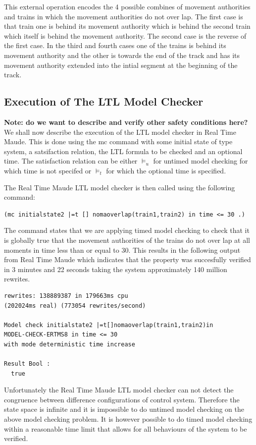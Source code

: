 This external operation encodes the 4 possible combines of movement authorities and trains in which the movement authorities do not over lap.  The first case is that train one is behind its movement authority which is behind the second train which itself is behind the movement authority. The second case is the reverse of the first case. In the third and fourth cases  one of the trains is behind its movement authority and the other is towards the end of the track and has its movement authority extended into the intial segment at the beginning of the track.

\subsection{Execution of The LTL Model Checker}
\textbf{Note: do we want to describe and verify other safety conditions here?}
We shall now describe the execution of the LTL model checker in Real Time Maude. This is done using the mc command with some initial state of type system, a satsifaction relation, the LTL formula to be checked and an optional time. The satisfaction relation can be either $\models_u$ for untimed model checking for which time is not specifed or $\models_t$ for which the optional time is specified.

The Real Time Maude LTL model checker is then called using the following command:

\begin{center}
\texttt{(mc initialstate2 |=t [] nomaoverlap(train1,train2) in time <= 30 .)}
\end{center}
The command states that we are applying timed model checking to check that it is globally true that the movement authorities of the trains do not over lap at all moments in time less than or equal to 30. This results in the following output from Real Time Maude which indicates that the property was succesfully verified in 3 minutes and 22 seconds taking the system approximately 140 million rewrites.
\begin{lstlisting}[caption = No overlapping movement authorities model checking result]
rewrites: 138889387 in 179663ms cpu 
(202024ms real) (773054 rewrites/second)

Model check initialstate2 |=t[]nomaoverlap(train1,train2)in 
MODEL-CHECK-ERTMS8 in time <= 30 
with mode deterministic time increase

Result Bool :
  true
\end{lstlisting}

Unfortunately the Real Time Maude LTL model checker can not detect the congruence between difference configurations of control system. Therefore the state space is infinite and it is impossible to do untimed model checking on the above model checking problem. It is however possible to do timed model checking within a reasonable time limit that allows for all behaviours of the system to be verified.

